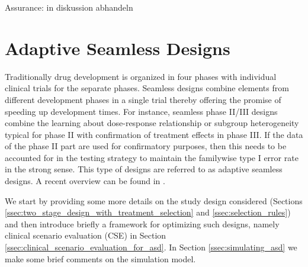 \documentclass[bimj,fleqn]{w-art}
\theoremstyle{plain}
\theoremstyle{definition}
\begin{document}



Assurance: \cite{stallard_optimal_2009} in diskussion abhandeln

\section{Adaptive Seamless Designs}
\label{sec:adaptive_seamless_designs}

Traditionally drug development is organized in four phases with individual clinical trials for the separate phases. Seamless designs combine elements from different development phases in a single trial thereby offering the promise of speeding up development times. For instance, seamless phase II/III designs combine the learning about dose-response relationship or subgroup heterogeneity typical for phase II with confirmation of treatment effects in  phase III. If the data of the phase II part are used for confirmatory purposes, then this needs to be accounted for in the testing strategy to maintain the familywise type I error rate in the strong sense. This type of designs are referred to as adaptive seamless designs. A recent overview can be found in \citet{friede_adaptive_2020}.

We start by providing some more details on the study design considered (Sections \ref{ssec:two_stage_design_with_treatment_selection} and \ref{ssec:selection_rules}) and then introduce briefly a framework for optimizing such designs, namely clinical scenario evaluation (CSE) in Section \ref{ssec:clinical_scenario_evaluation_for_asd}. In Section \ref{ssec:simulating_asd} we make some brief comments on the simulation model.
\end{document}
